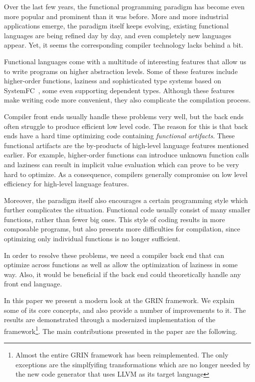 \documentclass[main.tex]{subfiles}
\begin{document}
	
	Over the last few years, the functional programming paradigm has become even more popular and prominent than it was before. More and more industrial applications emerge, the paradigm itself keeps evolving, existing functional languages are being refined day by day, and even completely new languages appear. Yet, it seems the corresponding compiler technology lacks behind a bit.
	
	Functional languages come with a multitude of interesting features that allow us to write programs on higher abstraction levels. Some of these features include higher-order functions, laziness and sophisticated type systems based on SystemFC~\cite{systemfc}, some even supporting dependent types. Although these features make writing code more convenient, they also complicate the compilation process.
	
	Compiler front ends usually handle these problems very well, but the back ends often struggle to produce efficient low level code. The reason for this is that back ends have a hard time optimizing code containing \emph{functional artifacts}. These functional artifacts are the by-products of high-level language features mentioned earlier. For example, higher-order functions can introduce unknown function calls and laziness can result in implicit value evaluation which can prove to be very hard to optimize. As a consequence, compilers generally compromise on low level efficiency for high-level language features.
	
	Moreover, the paradigm itself also encourages a certain programming style which further complicates the situation. Functional code usually consist of many smaller functions, rather than fewer big ones. This style of coding results in more composable programs, but also presents more difficulties for compilation, since optimizing only individual functions is no longer sufficient. 
	
	In order to resolve these problems, we need a compiler back end that can optimize across functions as well as allow the optimization of laziness in some way. Also, it would be beneficial if the back end could theoretically handle any front end language.
	
	In this paper we present a modern look at the GRIN framework. We explain some of its core concepts, and also provide a number of improvements to it. The results are demonstrated through a modernized implementation of the framework\footnote{Almost the entire GRIN framework has been reimplemented. The only exceptions are the simplfyifing transformations which are no longer needed by the new code generator that uses LLVM as its target language}. The main contributions presented in the paper are the following.
	
\end{document}
